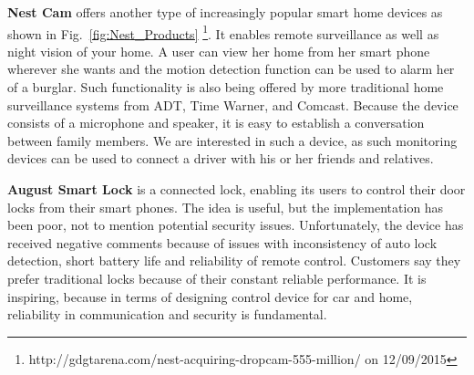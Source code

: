 \textbf{Nest Cam} offers another type of increasingly popular smart home devices as shown in Fig.~\ref{fig:Nest_Products} \footnote{http://gdgtarena.com/nest-acquiring-dropcam-555-million/ on 12/09/2015}. It enables remote surveillance as well as night vision of your home. A user can view her home from her smart phone wherever she wants and the motion detection function can be used to alarm her of a burglar. Such functionality is also being offered by more traditional home surveillance systems from ADT, Time Warner, and Comcast.
Because the device consists of a microphone and speaker, it is easy to establish a conversation between family members. 
We are interested in such a device, as such monitoring devices can be used to connect a driver with his or her friends and relatives.  

\textbf{August Smart Lock} is a connected lock, enabling its users to control their door locks from their smart phones. The idea is useful, but the implementation has been poor, not to mention potential security issues.
Unfortunately, the device has received negative comments because of issues with inconsistency of auto lock detection, short battery life and reliability of remote control. Customers say they prefer traditional locks because of their constant reliable performance.  It is inspiring, because in terms of designing control device for car and home, reliability in communication and security is fundamental. 




